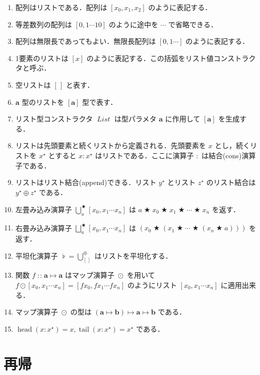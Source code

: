 \documentclass[a4paper]{jsbook}
\newcommand{\mListWith}[1]{\left[#1\right]}
\newcommand{\mType}[1]{\mathbf{#1}}
\newcommand{\mListType}[1]{\mListWith{\mType{#1}}}
\newcommand{\mTypeConstructor}[1]{\mathit{#1}} %
\newcommand{\mEmptyList}{{[\,]}}
\newcommand{\mList}[1]{{#1}^\mathrm{\star}}
\DeclareMathOperator{\mIn}{{:\!:}}
\DeclareMathOperator{\mMapsTo}{\mapsto}
\DeclareMathOperator{\mBinOp}{\bigstar}
\DeclareMathOperator*{\mFold}{\bigcup}
\DeclareMathOperator*{\mFoldRight}{\bigsqcup}
\DeclareMathOperator{\mConcat}{\flat}
\DeclareMathOperator{\mAppend}{\oplus}
\DeclareMathOperator{\mMapList}{\odot}
\DeclareMathOperator{\mHead}{head}
\DeclareMathOperator{\mTail}{tail}
\DeclareMathOperator{\mListTypeConstructor}{\mTypeConstructor{List}}
\newcommand{\mProj}[2]{#1\mMapsTo#2}
\begin{document}
\begin{enumerate}
\item 配列はリストである．配列は $\mListWith{x_0,x_1,x_2}$ のように表記する．
\item 等差数列の配列は $\mListWith{0,1\dotsb10}$ のように途中を $\dotsb$ で省略できる．
\item 配列は無限長であってもよい．無限長配列は $\mListWith{0,1\dotsb}$ のように表記する．
\item 1要素のリストは $\mListWith{x}$ のように表記する．この括弧をリスト値コンストラクタと呼ぶ．
\item 空リストは $\mEmptyList$ と表す．
\item $\mType{a}$ 型のリストを $\mListType{a}$ 型で表す．
\item リスト型コンストラクタ $\mListTypeConstructor$ は型パラメタ $\mType{a}$ に作用して $\mListType{a}$ を生成する．
\item リストは先頭要素と続くリストから定義される．先頭要素を $x$ とし，続くリストを $\mList{x}$ とすると $x:\mList{x}$ はリストである．ここに演算子 $:$ は結合(cons)演算子である．
\item リストはリスト結合(append)できる．リスト $\mList{y}$ とリスト $\mList{z}$ のリスト結合は $\mList{y}\mAppend\mList{z}$ である．
\item 左畳み込み演算子 $\mFold^{\mBinOp}_a\mListWith{x_0,x_1\dotsb x_n}$ は $a\mBinOp x_0\mBinOp x_1\mBinOp\dotsb\mBinOp x_n$ を返す．
\item 右畳み込み演算子 $\mFoldRight^{\mBinOp}_{a}\mListWith{x_0,x_1\dotsb x_n}$ は
 $(x_0\mBinOp(x_1\mBinOp\dotsb\mBinOp(x_n\mBinOp a)))$ を返す．
\item 平坦化演算子 $\mConcat=\mFold_\mEmptyList^{\mAppend}$ はリストを平坦化する．
\item 関数 $f\mIn\mProj{\mType{a}}{\mType{a}}$ はマップ演算子 $\mMapList$ を用いて $f\mMapList\mListWith{x_0,x_1\dotsb x_n}=\mListWith{fx_0,fx_1\dotsb fx_n}$ のようにリスト $\mListWith{x_0,x_1\dotsb x_n}$ に適用出来る．
\item マップ演算子 $\mMapList$ の型は $\mProj{(\mProj{\mType{a}}{\mType{b}})}{\mProj{\mType{a}}{\mType{b}}}$ である．
\item $\mHead(x:\mList{x})=x,\mTail(x:\mList{x})=\mList{x}$ である．
\end{enumerate}



\chapter{再帰}
\end{document}

